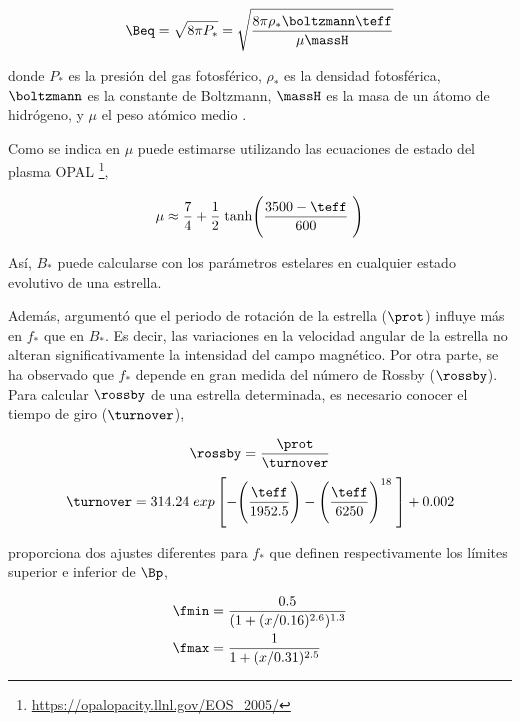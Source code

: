 \begin{equation}
	\Beq = \sqrt{8\pi P_*} = \sqrt{\frac{8\pi\rho_* \boltzmann \teff}{\mu\massH}}\label{eq:mf_beq}    
\end{equation}

donde $P_*$ es la presión del gas fotosférico, $\rho_*$ es la densidad fotosférica, $\boltzmann$ es la constante de Boltzmann, $\massH$ es la masa de un átomo de hidrógeno, y $\mu$ el peso atómico medio \citep{Cranmer2011}. \par

Como se indica en \cite{Cranmer2011} $\mu$ puede estimarse utilizando las ecuaciones de estado del plasma OPAL \footnote{\url{https://opalopacity.llnl.gov/EOS_2005/}},

\begin{equation}
	\mu \approx \frac{7}{4} + \frac{1}{2} \; \textrm{tanh}\Bigg(\frac{3500-\teff}{600}\;\Bigg) \label{eq:mf_atom_weight}
\end{equation}

Así, $B_*$ puede calcularse con los parámetros estelares en cualquier estado evolutivo de una estrella.\par

Además, \citet{Cranmer2011} argumentó que el periodo de rotación de la estrella ($\prot$) influye más en $f_*$ que en $B_*$. Es decir, las variaciones en la velocidad angular de la estrella no alteran significativamente la intensidad del campo magnético. Por otra parte, se ha observado que $f_*$ depende en gran medida del número de Rossby ($\rossby$). Para calcular $\rossby$ de una estrella determinada, es necesario conocer el tiempo de giro ($\turnover$),

\begin{equation}
	\rossby = \frac{\prot}{\turnover} \label{eq:mf_rossby}
\end{equation}
\begin{equation}
	\turnover = 314.24\;exp\left[-\Bigg(\frac{\teff}{1952.5}\Bigg)-\Bigg(\frac{\teff}{6250}\Bigg)^{18} \;\right]+0.002 \label{eq:mf_turnover}
\end{equation}

\cite{Cranmer2011} proporciona dos ajustes diferentes para $f_*$ que definen respectivamente los límites superior e inferior de $\Bp$,

\begin{align}
	\fmin &= \frac{0.5}{(1+(x/0.16)^{2.6})^{1.3}} \label{eq:fmin}\\
	\fmax &= \frac{1}{1+(x/0.31)^{2.5}} \label{eq:fmax}
\end{align}

